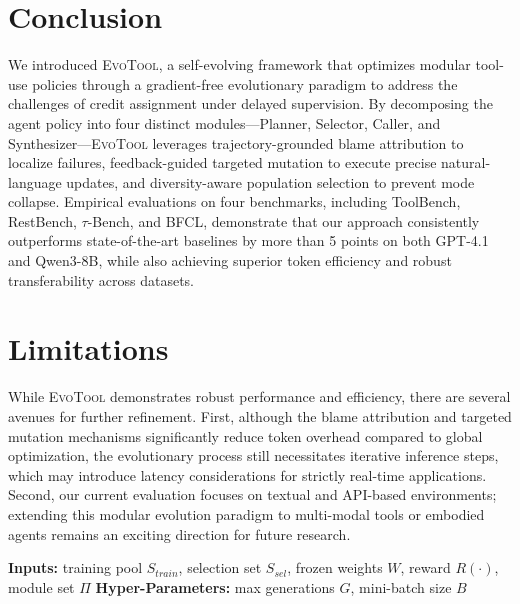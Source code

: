 \documentclass[11pt]{article}
\begin{document}
{\section{Conclusion}
We introduced \textsc{EvoTool}, a self-evolving framework that optimizes modular tool-use policies through a gradient-free evolutionary paradigm to address the challenges of credit assignment under delayed supervision. By decomposing the agent policy into four distinct modules—Planner, Selector, Caller, and Synthesizer—\textsc{EvoTool} leverages trajectory-grounded blame attribution to localize failures, feedback-guided targeted mutation to execute precise natural-language updates, and diversity-aware population selection to prevent mode collapse. Empirical evaluations on four benchmarks, including ToolBench, RestBench, $\tau$-Bench, and BFCL, demonstrate that our approach consistently outperforms state-of-the-art baselines by more than 5 points on both GPT-4.1 and Qwen3-8B, while also achieving superior token efficiency and robust transferability across datasets.
















\section*{Limitations}

While \textsc{EvoTool} demonstrates robust performance and efficiency, there are several avenues for further refinement. First, although the blame attribution and targeted mutation mechanisms significantly reduce token overhead compared to global optimization, the evolutionary process still necessitates iterative inference steps, which may introduce latency considerations for strictly real-time applications. Second, our current evaluation focuses on textual and API-based environments; extending this modular evolution paradigm to multi-modal tools or embodied agents remains an exciting direction for future research.



\clearpage
\appendix


\begin{algorithm*}[!t]
\caption{\textsc{EvoTool}: Self-Evolving Tool-use Policy Optimization}
\label{alg:evotool}
\begin{algorithmic}[1]
\Require \textbf{Inputs:} training pool $S_{train}$, selection set $S_{sel}$, frozen weights $W$, reward $R(\cdot)$, module set $\Pi$
\Require \textbf{Hyper-Parameters:} max generations $G$, mini-batch size $B$


\end{algorithmic}
\end{algorithm*}}
\end{document}

